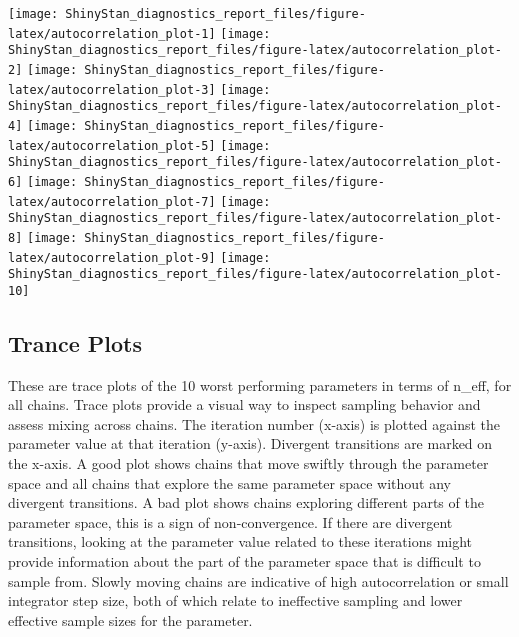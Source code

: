 \documentclass[11pt,]{article}
\begin{document}
\texttt{[image: ShinyStan\_diagnostics\_report\_files/figure-latex/autocorrelation\_plot-1]}
\texttt{[image: ShinyStan\_diagnostics\_report\_files/figure-latex/autocorrelation\_plot-2]}
\texttt{[image: ShinyStan\_diagnostics\_report\_files/figure-latex/autocorrelation\_plot-3]}
\texttt{[image: ShinyStan\_diagnostics\_report\_files/figure-latex/autocorrelation\_plot-4]}
\texttt{[image: ShinyStan\_diagnostics\_report\_files/figure-latex/autocorrelation\_plot-5]}
\texttt{[image: ShinyStan\_diagnostics\_report\_files/figure-latex/autocorrelation\_plot-6]}
\texttt{[image: ShinyStan\_diagnostics\_report\_files/figure-latex/autocorrelation\_plot-7]}
\texttt{[image: ShinyStan\_diagnostics\_report\_files/figure-latex/autocorrelation\_plot-8]}
\texttt{[image: ShinyStan\_diagnostics\_report\_files/figure-latex/autocorrelation\_plot-9]}
\texttt{[image: ShinyStan\_diagnostics\_report\_files/figure-latex/autocorrelation\_plot-10]}

\newpage

\hypertarget{trance-plots}{%
\subsection{Trance Plots}\label{trance-plots}}

These are trace plots of the 10 worst performing parameters in terms of
n\_eff, for all chains. Trace plots provide a visual way to inspect
sampling behavior and assess mixing across chains. The iteration number
(x-axis) is plotted against the parameter value at that iteration
(y-axis). Divergent transitions are marked on the x-axis. A good plot
shows chains that move swiftly through the parameter space and all
chains that explore the same parameter space without any divergent
transitions. A bad plot shows chains exploring different parts of the
parameter space, this is a sign of non-convergence. If there are
divergent transitions, looking at the parameter value related to these
iterations might provide information about the part of the parameter
space that is difficult to sample from. Slowly moving chains are
indicative of high autocorrelation or small integrator step size, both
of which relate to ineffective sampling and lower effective sample sizes
for the parameter.
\end{document}
